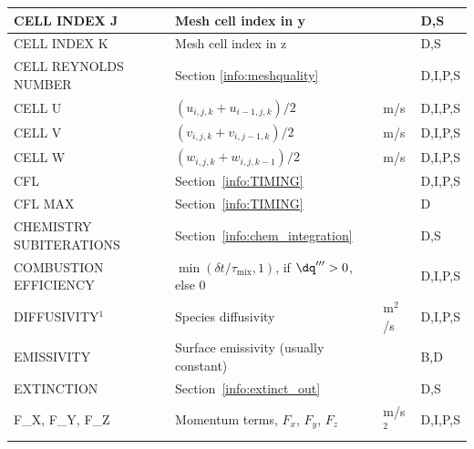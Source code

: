 \documentclass[11pt]{book}
\begin{document}
\begin{longtable}{@{\extracolsep{\fill}}|l|l|l|l|}
{\ct CELL INDEX J}                              & Mesh cell index in y                              &                & D,S          \\ \hline
{\ct CELL INDEX K}                              & Mesh cell index in z                              &                & D,S          \\ \hline
{\ct CELL REYNOLDS NUMBER}                      & Section \ref{info:meshquality}                    &                & D,I,P,S      \\ \hline
{\ct CELL U}                                    & $(u_{i,j,k}+u_{i-1,j,k})/2$                       & m/s            & D,I,P,S      \\ \hline
{\ct CELL V}                                    & $(v_{i,j,k}+v_{i,j-1,k})/2$                       & m/s            & D,I,P,S      \\ \hline
{\ct CELL W}                                    & $(w_{i,j,k}+w_{i,j,k-1})/2$                       & m/s            & D,I,P,S      \\ \hline
{\ct CFL}                                       & Section~\ref{info:TIMING}                         &                & D,I,P,S      \\ \hline
{\ct CFL MAX}                                   & Section~\ref{info:TIMING}                         &                & D            \\ \hline
{\ct CHEMISTRY SUBITERATIONS}                   & Section~\ref{info:chem_integration}               &                & D,S          \\ \hline
{\ct COMBUSTION EFFICIENCY}                     & $\min(\delta t/\tau_{\mathrm{mix}},1)$, if $\dq'''>0$, else 0 &    & D,I,P,S      \\ \hline
{\ct DIFFUSIVITY}$^1$                           & Species diffusivity                               & m$^2$/s        & D,I,P,S      \\ \hline
{\ct EMISSIVITY}                                & Surface emissivity (usually constant)             &                & B,D          \\ \hline
{\ct EXTINCTION}                                & Section~\ref{info:extinct_out}                    &                & D,S          \\ \hline
{\ct F\_X, F\_Y, F\_Z}                          & Momentum terms, $F_x$, $F_y$, $F_z$               & m/s$^2$        & D,I,P,S      \\ \hline

\end{longtable}
\end{document}

